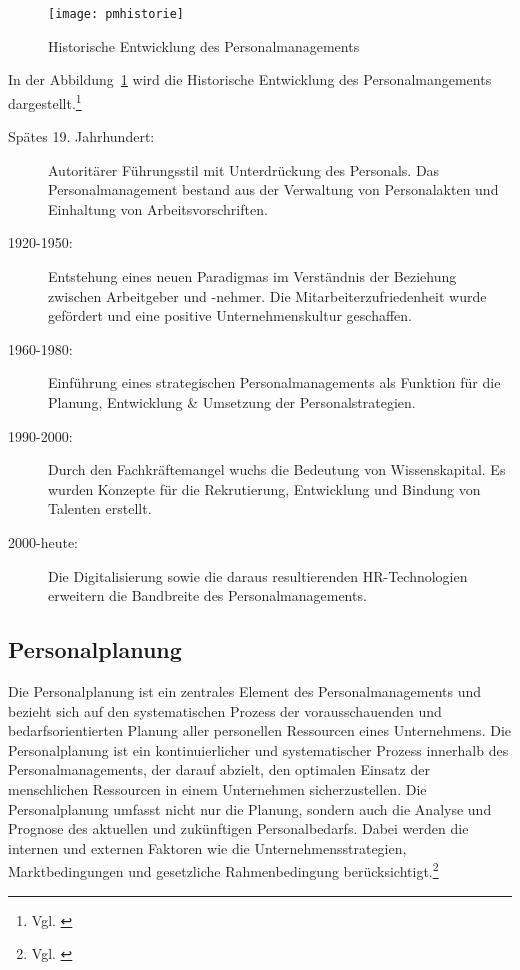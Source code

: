 %

\begin{figure}%
\centering
\texttt{[image: pmhistorie]}
\caption{Historische Entwicklung des Personalmanagements}
\label{fig:pmhistorie}
\end{figure}

In der Abbildung~\ref{fig:pmhistorie} wird die Historische Entwicklung des Personalmangements dargestellt.\footnote{Vgl. \cite[S. 2-11]{Haufe2016}}

 \begin{description}
\item[Spätes 19. Jahrhundert:] Autoritärer Führungsstil mit Unterdrückung des Personals. Das Personalmanagement bestand aus der Verwaltung von Personalakten und Einhaltung von Arbeitsvorschriften.

\item[1920-1950:] Entstehung eines neuen Paradigmas im Verständnis der Beziehung zwischen Arbeitgeber und -nehmer. Die Mitarbeiterzufriedenheit wurde gefördert und eine positive Unternehmenskultur geschaffen.

\item[1960-1980:] Einführung eines strategischen Personalmanagements als Funktion für die Planung, Entwicklung \& Umsetzung der Personalstrategien.

\item[1990-2000:] Durch den Fachkräftemangel wuchs die Bedeutung von Wissenskapital. Es wurden Konzepte für die Rekrutierung, Entwicklung und Bindung von Talenten erstellt.

\item[2000-heute:] Die Digitalisierung sowie die daraus resultierenden HR-Technologien erweitern die Bandbreite des Personalmanagements.

\end{description}

\subsection{Personalplanung}
Die Personalplanung ist ein zentrales Element des Personalmanagements und bezieht sich auf den systematischen Prozess der vorausschauenden und bedarfsorientierten Planung aller personellen Ressourcen eines Unternehmens. Die Personalplanung ist ein kontinuierlicher und systematischer Prozess innerhalb des Personalmanagements, der darauf abzielt, den optimalen Einsatz der menschlichen Ressourcen in einem Unternehmen sicherzustellen. Die Personalplanung umfasst nicht nur die Planung, sondern auch die Analyse und Prognose des aktuellen und zukünftigen Personalbedarfs. Dabei werden die internen und externen Faktoren wie die Unternehmensstrategien, Marktbedingungen und gesetzliche Rahmenbedingung berücksichtigt.\footnote{Vgl. \cite[S. 2-11]{Jahn03:EntwicklungPM}}

